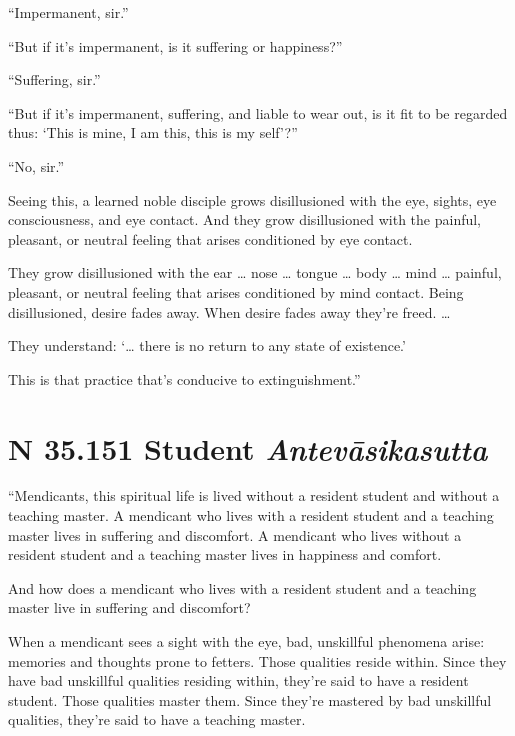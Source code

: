 \documentclass[12pt,openany]{book}%
\newcommand*{\suttatitleacronym}[1]{\smaller[2]{#1}\vspace*{.3em}}
\newcommand*{\suttatitletranslation}[1]{\linebreak{#1}}
\newcommand*{\suttatitleroot}[1]{\linebreak\smaller[2]\itshape{#1}}
\newcommand*{\tocacronym}[1]{\hspace*{-3.3em}{#1}\quad}
\newcommand*{\toctranslation}[1]{#1}
\newcommand*{\tocroot}[1]{(\textit{#1})}
\begin{document}
“Impermanent, sir.” 

“But if it’s impermanent, is it suffering or happiness?” 

“Suffering, sir.” 

“But if it’s impermanent, suffering, and liable to wear out, is it fit to be regarded thus: ‘This is mine, I am this, this is my self’?” 

“No, sir.” 

Seeing this, a learned noble disciple grows disillusioned with the eye, sights, eye consciousness, and eye contact. And they grow disillusioned with the painful, pleasant, or neutral feeling that arises conditioned by eye contact. 

They grow disillusioned with the ear … nose … tongue … body … mind … painful, pleasant, or neutral feeling that arises conditioned by mind contact. Being disillusioned, desire fades away. When desire fades away they’re freed. … 

They understand: ‘… there is no return to any state of existence.’ 

This is that practice that’s conducive to extinguishment.” 

%
\section*{{\suttatitleacronym SN 35.151}{\suttatitletranslation A Student }{\suttatitleroot Antevāsikasutta}}
\addcontentsline{toc}{section}{\tocacronym{SN 35.151} \toctranslation{A Student } \tocroot{Antevāsikasutta}}

“Mendicants, this spiritual life is lived without a resident student and without a teaching master. A mendicant who lives with a resident student and a teaching master lives in suffering and discomfort. A mendicant who lives without a resident student and a teaching master lives in happiness and comfort. 

And how does a mendicant who lives with a resident student and a teaching master live in suffering and discomfort? 

When a mendicant sees a sight with the eye, bad, unskillful phenomena arise: memories and thoughts prone to fetters. Those qualities reside within. Since they have bad unskillful qualities residing within, they’re said to have a resident student. Those qualities master them. Since they’re mastered by bad unskillful qualities, they’re said to have a teaching master. 
\end{document}
